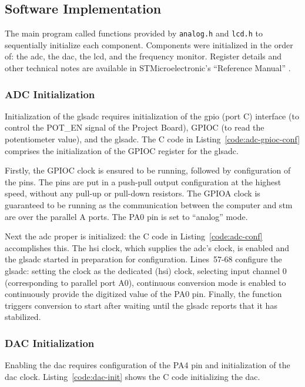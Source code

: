 \subsection{Software Implementation}
The main program called functions provided by \lstinline{analog.h} and
\lstinline{lcd.h} to sequentially initialize each component. Components
were initialized in the order of: the \gls{adc}, the \gls{dac}, the
\gls{lcd}, and the frequency monitor. Register details and other
technical notes are available in STMicroelectronic's ``Reference
Manual''
\cite{ref}.


\subsubsection{ADC Initialization}
Initialization of the gls{adc} requires initialization of the \gls{gpio}
(port C) interface (to control the POT\_EN signal of the Project Board),
GPIOC (to read the potentiometer value), and the gls{adc}. The C code in
Listing~\ref{code:adc-gpioc-conf} comprises the initialization of the
GPIOC register for the gls{adc}.


Firstly, the GPIOC clock is ensured to be running, followed by
configuration of the pins. The pins are put in a push-pull output
configuration at the highest speed, without any pull-up or pull-down
resistors. The GPIOA clock is guaranteed to be running as the
communication between the computer and \gls{stm} are over the parallel
A ports. The PA0 pin is set to ``analog'' mode. \\


Next the \gls{adc} proper is initialized: the C code in
Listing~\ref{code:adc-conf} accomplishes this.  The \gls{hsi} clock, which
supplies the \gls{adc}'s clock, is enabled and the gls{adc} started in preparation
for configuration. Lines~57-68 configure the gls{adc}: setting the clock as
the dedicated (\gls{hsi}) clock, selecting input channel 0 (corresponding to
parallel port A0), continuous conversion mode is enabled to continuously
provide the digitized value of the PA0 pin. Finally, the function
triggers conversion to start after waiting until the gls{adc} reports that it
has stabilized.

\subsubsection{DAC Initialization}
Enabling the \gls{dac} requires configuration of the PA4 pin and
initialization of the \gls{dac} clock. Listing~\ref{code:dac-init} shows
the C code initializing the \gls{dac}.

